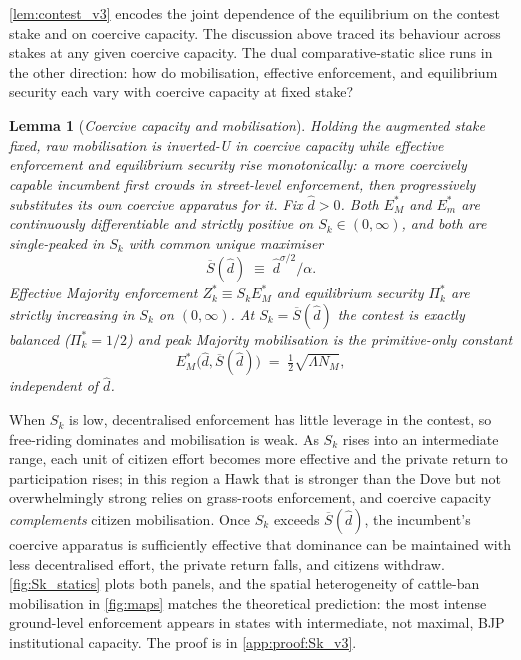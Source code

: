 \documentclass[11pt,twoside]{extarticle}
\newtheorem{lemma}{Lemma}
\begin{document}
\autoref{lem:contest_v3} encodes the joint dependence of the equilibrium on the contest stake and on coercive capacity. The discussion above traced its behaviour across stakes at any given coercive capacity. The dual comparative-static slice runs in the other direction: how do mobilisation, effective enforcement, and equilibrium security each vary with coercive capacity at fixed stake?

\begin{lemma}[\emph{Coercive capacity and mobilisation}]\label{lem:Sk_v3}
\emph{Holding the augmented stake fixed, raw mobilisation is inverted-U in coercive capacity while effective enforcement and equilibrium security rise monotonically: a more coercively capable incumbent first crowds in street-level enforcement, then progressively substitutes its own coercive apparatus for it.}
Fix $\hat d>0$. Both $E_M^*$ and $E_m^*$ are continuously differentiable and strictly positive on $S_k\in(0,\infty)$, and both are single-peaked in $S_k$ with common unique maximiser
\begin{equation}\label{eq:Sk_threshold_v3}
    \overline S(\hat d)\;\equiv\;\hat d^{\sigma/2}/\alpha.
\end{equation}
Effective Majority enforcement $Z_k^*\equiv S_k E_M^*$ and equilibrium security $\Pi_k^*$ are strictly increasing in $S_k$ on $(0,\infty)$. At $S_k=\overline S(\hat d)$ the contest is exactly balanced ($\Pi_k^*=1/2$) and peak Majority mobilisation is the primitive-only constant
\begin{equation}\label{eq:EM_peak_v3}
    E_M^*\big(\hat d,\overline S(\hat d)\big)\;=\;\tfrac12\sqrt{\Lambda N_M},
\end{equation}
independent of $\hat d$.
\end{lemma}

When $S_k$ is low, decentralised enforcement has little leverage in the contest, so free-riding dominates and mobilisation is weak. As $S_k$ rises into an intermediate range, each unit of citizen effort becomes more effective and the private return to participation rises; in this region a Hawk that is stronger than the Dove but not overwhelmingly strong relies on grass-roots enforcement, and coercive capacity \emph{complements} citizen mobilisation. Once $S_k$ exceeds $\overline S(\hat d)$, the incumbent's coercive apparatus is sufficiently effective that dominance can be maintained with less decentralised effort, the private return falls, and citizens withdraw. \autoref{fig:Sk_statics} plots both panels, and the spatial heterogeneity of cattle-ban mobilisation in \autoref{fig:maps} matches the theoretical prediction: the most intense ground-level enforcement appears in states with intermediate, not maximal, BJP institutional capacity. The proof is in \autoref{app:proof:Sk_v3}.
\end{document}

